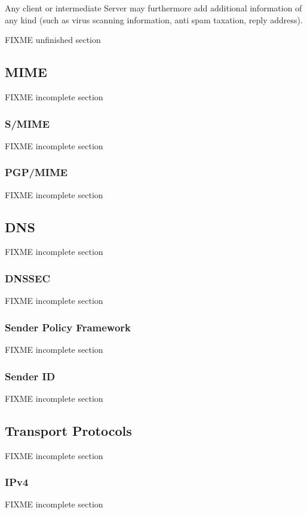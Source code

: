 Any client or intermediate Server may furthermore add additional information of any kind (such as virus scanning information, anti spam taxation, reply address).

FIXME unfinished section

\subsection{MIME}
\cite{RFC2045}
\cite{RFC2046}
\cite{RFC2047}
\cite{RFC2048}
\cite{RFC2049}
FIXME incomplete section

\subsubsection{S/MIME}
\cite{RFC3851}
FIXME incomplete section

\subsubsection{PGP/MIME}
\cite{RFC2440}
FIXME incomplete section

\subsection{DNS}
\cite{RFC2929}
FIXME incomplete section

\subsubsection{DNSSEC}
\cite{RFC5155}
FIXME incomplete section

\subsubsection{Sender Policy Framework}
\cite{RFC4408}
\cite{RFC6652}
FIXME incomplete section

\subsubsection{Sender ID}
\cite{RFC4401}
FIXME incomplete section

\subsection{Transport Protocols}
FIXME incomplete section

\subsubsection{IPv4}
\cite{RFC760}
\cite{RFC791}
\cite{RFC1180}
\cite{RFC792}
\cite{RFC919}
\cite{RFC922}
\cite{RFC950}
\cite[p.~3]{RFC793}
FIXME incomplete section

